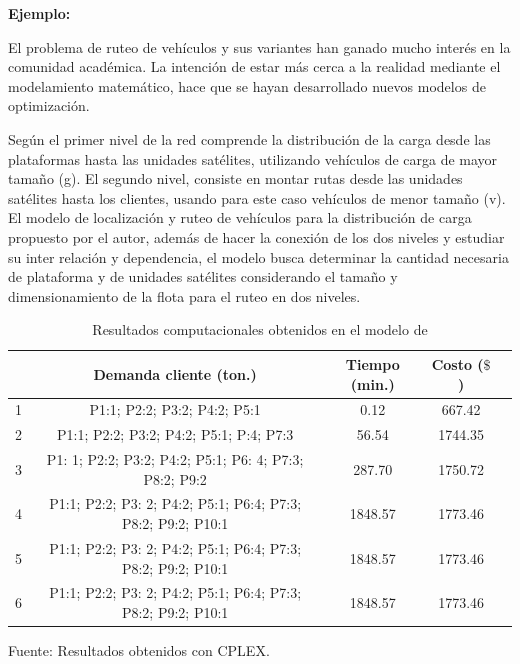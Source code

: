 {\bf Ejemplo:}\par

El problema de ruteo de vehículos \citep{Ombuki, Yeun} y sus variantes han ganado mucho interés en la comunidad académica. La intención de estar más cerca a la realidad mediante el modelamiento matemático, hace que se hayan desarrollado nuevos modelos de optimización. \par
\vskip 0.3cm
Según \cite{Sterle} el primer nivel de la red comprende la distribución de la carga desde las plataformas hasta las unidades satélites, utilizando vehículos de carga de mayor tamaño (g).  El segundo nivel, consiste en montar rutas desde las unidades satélites hasta los clientes, usando para este caso vehículos de menor tamaño (v). El modelo de localización y ruteo de vehículos para la distribución de carga propuesto por el autor, además de hacer la conexión de los dos niveles y estudiar su inter relación y dependencia, el modelo busca determinar la cantidad necesaria de plataforma y de unidades satélites considerando el tamaño y dimensionamiento de la flota para el ruteo en dos niveles. 
\vskip 0.2cm

\begin{table}[h!]
\begin{center}
\caption{\small{Resultados computacionales obtenidos en el modelo de \cite{Sterle}}}
\end{center}
\vskip -0.7cm
\begin{tabular}{|c|c|c|c|c|}
\hline 
\rowcolor{LightBlue2}{\small Escenarios} & {\small Demanda cliente (ton.)} & {\small Tiempo (min.)} & {\small Costo ($\$$)} \\ 
\hline 
{\small 1} & {\small P1:1; P2:2; P3:2; P4:2; P5:1} & {\small 0.12} & {\small 667.42} \\ 
\hline 
{\small 2} & {\small P1:1; P2:2; P3:2; P4:2; P5:1; P:4; P7:3} & {\small 56.54} & {\small 1744.35} \\ 
\hline 
{\small 3} & {\small P1: 1; P2:2; P3:2; P4:2; P5:1; P6: 4; P7:3; P8:2; P9:2} & {\small 287.70} & {\small 1750.72} \\ 
\hline 
{\small 4} & {\small P1:1; P2:2; P3: 2; P4:2; P5:1; P6:4; P7:3; P8:2; P9:2; P10:1} & {\small 1848.57} & {\small 1773.46} \\ 
\hline 
{\small 5} & {\small P1:1; P2:2; P3: 2; P4:2; P5:1; P6:4; P7:3; P8:2; P9:2; P10:1} & {\small 1848.57} & {\small 1773.46} \\ 
\hline 
{\small 6} & {\small P1:1; P2:2; P3: 2; P4:2; P5:1; P6:4; P7:3; P8:2; P9:2; P10:1} & {\small 1848.57} & {\small 1773.46} \\ 
\hline 
\end{tabular} 
\begin{center}
\vskip -0.2cm
{\small{Fuente: Resultados obtenidos con CPLEX.}}
\end{center}
\end{table}


